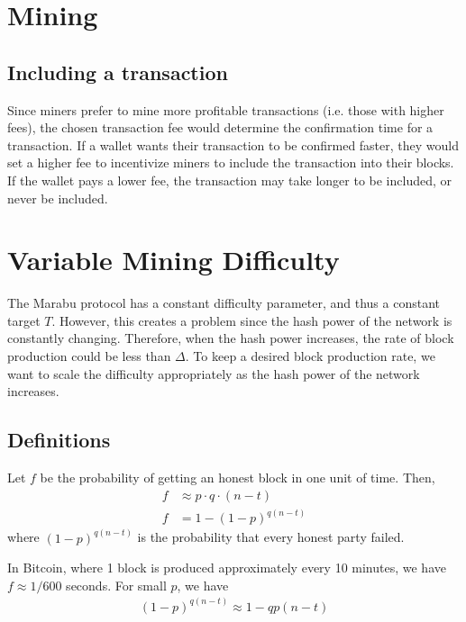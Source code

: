 \section{Mining}

\subsection{Including a transaction}
Since miners prefer to mine more profitable transactions (i.e. those with higher fees), the chosen transaction fee would determine the confirmation time for a transaction. If a wallet wants their transaction to be confirmed faster, they would set a higher fee to incentivize miners to include the transaction into their blocks. If the wallet pays a lower fee, the transaction may take longer to be included, or never be included.

\section{Variable Mining Difficulty}
The Marabu protocol has a constant difficulty parameter, and thus a constant target $T$. However, this creates a problem since the hash power of the network is constantly changing. Therefore, when the hash power increases, the rate of block production could be less than $\Delta$. To keep a desired block production rate, we want to scale the difficulty appropriately as the hash power of the network increases.

\subsection{Definitions}

\begin{definition}
    Let $f$ be the probability of getting an honest block in one unit of time. Then,
\begin{align*}
    f &\approx p \cdot q \cdot (n-t) \\
    f &= 1- (1-p)^{q(n-t)}
\end{align*}
where $(1-p)^{q(n-t)}$ is the probability that every honest party failed.
\end{definition}
In Bitcoin, where 1 block is produced approximately every 10 minutes, we have $f \approx 1/600$ seconds. For small $p$, we have
\begin{align*}
    (1-p)^{q(n-t)} \approx 1 - qp(n-t)
\end{align*}

